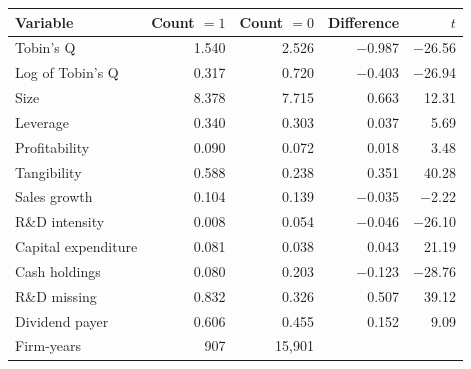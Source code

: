 \begin{tabular}{lrrrr}
\toprule
Variable & Count $=1$ & Count $=0$ & Difference & $t$ \\
\midrule
Tobin's Q & 1.540 & 2.526 & $-$0.987 & $-$26.56 \\
Log of Tobin's Q & 0.317 & 0.720 & $-$0.403 & $-$26.94 \\
Size & 8.378 & 7.715 & 0.663 & 12.31 \\
Leverage & 0.340 & 0.303 & 0.037 & 5.69 \\
Profitability & 0.090 & 0.072 & 0.018 & 3.48 \\
Tangibility & 0.588 & 0.238 & 0.351 & 40.28 \\
Sales growth & 0.104 & 0.139 & $-$0.035 & $-$2.22 \\
R\&D intensity & 0.008 & 0.054 & $-$0.046 & $-$26.10 \\
Capital expenditure & 0.081 & 0.038 & 0.043 & 21.19 \\
Cash holdings & 0.080 & 0.203 & $-$0.123 & $-$28.76 \\
R\&D missing & 0.832 & 0.326 & 0.507 & 39.12 \\
Dividend payer & 0.606 & 0.455 & 0.152 & 9.09 \\
\midrule
Firm-years & 907 & 15,901 & & \\
\bottomrule
\end{tabular}
